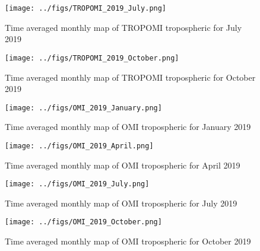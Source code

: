\begin{figure}[htpb]
    \centering
    \texttt{[image: ../figs/TROPOMI\_2019\_July.png]}
    \caption{Time averaged monthly map of TROPOMI tropospheric  for July 2019}
    \label{fig:TROPOMI_july_2019}
\end{figure}

\begin{figure}[htpb]
    \centering
    \texttt{[image: ../figs/TROPOMI\_2019\_October.png]}
    \caption{Time averaged monthly map of TROPOMI tropospheric  for October 2019}
    \label{fig:TROPOMI_oct_2019}
\end{figure}

\begin{figure}
    \centering
    \texttt{[image: ../figs/OMI\_2019\_January.png]}
    \caption{Time averaged monthly map of OMI tropospheric  for January 2019}
    \label{fig:OMI_jan_2019}
\end{figure}

\begin{figure}
    \centering
    \texttt{[image: ../figs/OMI\_2019\_April.png]}
    \caption{Time averaged monthly map of OMI tropospheric  for April 2019}
    \label{fig:OMI_apr_2019}
\end{figure}

\begin{figure}
    \centering
    \texttt{[image: ../figs/OMI\_2019\_July.png]}
    \caption{Time averaged monthly map of OMI tropospheric  for July 2019}
    \label{fig:OMI_july_2019}
\end{figure}


\begin{figure}
    \centering
    \texttt{[image: ../figs/OMI\_2019\_October.png]}
    \caption{Time averaged monthly map of OMI tropospheric  for October 2019}
    \label{fig:OMI_oct_2019}
\end{figure}